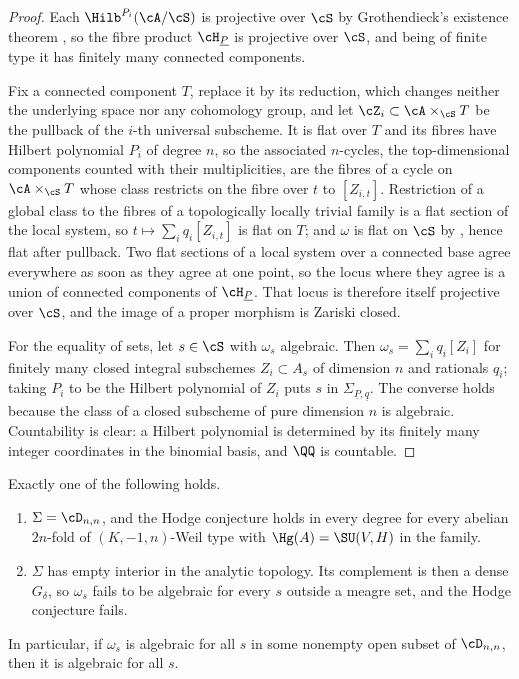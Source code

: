 \begin{proof}
Each $\Hilb^{P_{i}}(\cA/\cS)$ is projective over $\cS$ by Grothendieck's
existence theorem \cite{Gro61}, so the fibre product $\cH_{\underline{P}}$ is
projective over $\cS$, and being of finite type it has finitely many connected
components.

Fix a connected component $T$, replace it by its reduction, which changes
neither the underlying space nor any cohomology group, and let
$\cZ_{i}\subset\cA\times_{\cS}T$ be the pullback of the $i$-th universal
subscheme. It is flat over $T$ and its fibres have Hilbert polynomial $P_{i}$
of degree $n$, so the associated $n$-cycles, the top-dimensional components
counted with their multiplicities, are the fibres of a cycle on
$\cA\times_{\cS}T$ whose class restricts on the fibre over $t$ to $[Z_{i,t}]$.
Restriction of a global class to the fibres of a topologically
locally trivial family is a flat section of the local system, so
$t\mapsto\sum_{i}q_{i}[Z_{i,t}]$ is flat on $T$; and $\omega$ is flat on $\cS$
by , hence flat after pullback. Two flat sections of a
local system over a connected base agree everywhere as soon as they agree at
one point, so the locus where they agree is a union of connected components of
$\cH_{\underline{P}}$. That locus is therefore itself projective over $\cS$,
and the image of a proper morphism is Zariski closed.

For the equality of sets, let $s\in\cS$ with $\omega_{s}$ algebraic. Then
$\omega_{s}=\sum_{i}q_{i}[Z_{i}]$ for finitely many closed integral subschemes
$Z_{i}\subset A_{s}$ of dimension $n$ and rationals $q_{i}$; taking
$P_{i}$ to be the Hilbert polynomial of $Z_{i}$ puts $s$ in
$\Sigma_{\underline{P},\underline{q}}$. The converse holds because the class
of a closed subscheme of pure dimension $n$ is algebraic. Countability is
clear: a Hilbert polynomial is determined by its finitely many integer
coordinates in the binomial basis, and $\QQ$ is countable.
\end{proof}

\begin{corollary}\label{cor:allornothing}
Exactly one of the following holds.
\begin{enumerate}[label=\textup{(\alph*)},nosep]
\item $\Sigma=\cD_{n,n}$, and the Hodge conjecture holds in every degree for
  every abelian $2n$-fold of $(K,-1,n)$-Weil type with $\Hg(A)=\SU(V,H)$ in
  the family.
\item $\Sigma$ has empty interior in the analytic topology. Its complement is
  then a dense $G_{\delta}$, so $\omega_{s}$ fails to be algebraic for every
  $s$ outside a meagre set, and the Hodge conjecture fails.
\end{enumerate}
In particular, if $\omega_{s}$ is algebraic for all $s$ in some nonempty open
subset of $\cD_{n,n}$, then it is algebraic for all $s$.
\end{corollary}

